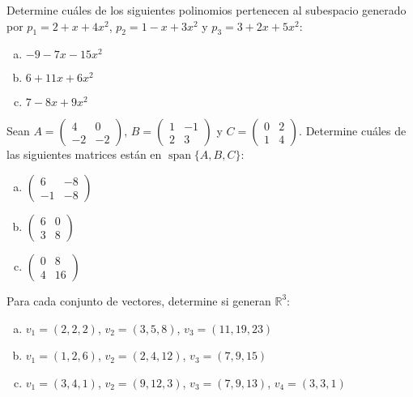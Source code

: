 \begin{prob} Determine cuáles de los siguientes polinomios pertenecen al subespacio generado por $p_1 = 2 + x + 4x^2$, $p_2 = 1 - x + 3x^2$ y $p_3 = 3 + 2x + 5x^2$:
\begin{enumerate}[(a)]
\item $-9 - 7x - 15x^2$
\item $6 + 11x + 6x^2$
\item $7 - 8x + 9x^2$
\end{enumerate}
\end{prob}

\begin{prob} Sean $A = \begin{pmatrix} 4 & 0 \\ -2 & -2 \end{pmatrix}$, $B = \begin{pmatrix} 1 & -1 \\ 2 & 3 \end{pmatrix}$ y $C = \begin{pmatrix} 0 & 2 \\ 1 & 4 \end{pmatrix}$. Determine cuáles de las siguientes matrices están en $\operatorname{span}\{A, B, C\}$:
\begin{enumerate}[(a)]
\item $\begin{pmatrix} 6 & -8 \\ -1 & -8 \end{pmatrix}$
\item $\begin{pmatrix} 6 & 0 \\ 3 & 8 \end{pmatrix}$
\item $\begin{pmatrix} 0 & 8 \\ 4 & 16 \end{pmatrix}$
\end{enumerate}
\end{prob}

\begin{prob} Para cada conjunto de vectores, determine si generan $\mathbb{R}^3$:
\begin{enumerate}[(a)]
\item $v_1 = (2,2,2)$, $v_2 = (3,5,8)$, $v_3 = (11,19,23)$
\item $v_1 = (1,2,6)$, $v_2 = (2,4,12)$, $v_3 = (7,9,15)$
\item $v_1 = (3,4,1)$, $v_2 = (9,12,3)$, $v_3 = (7,9,13)$, $v_4 = (3,3,1)$
\end{enumerate}
\end{prob}



